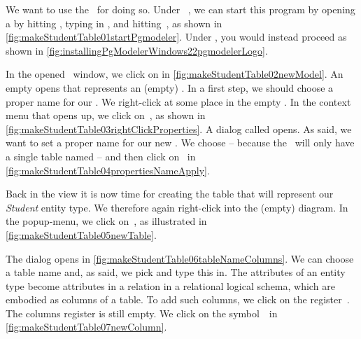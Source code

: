 We want to use the \pgmodeler\ for doing so.
Under \ubuntu\ \linux, we can start this program by opening a  by hitting \ubuntuTerminal, typing in , and hitting~\keys{\return}, as shown in \cref{fig:makeStudentTable01startPgmodeler}.
Under \microsoftWindows, you would instead proceed as shown in \cref{fig:installingPgModelerWindows22pgmodelerLogo}.

In the opened \pgmodeler\ window, we click on  in \cref{fig:makeStudentTable02newModel}.
An empty  opens that represents an (empty) \db.
In a first step, we should choose a proper name for our \db.
We right-click at some place in the empty .
In the context menu that opens up, we click on~, as shown in \cref{fig:makeStudentTable03rightClickProperties}.
A dialog called  opens.
As said, we want to set a proper name for our new \db.
We choose  -- because the \db\ will only have a single table named  -- and then click on~ in \cref{fig:makeStudentTable04propertiesNameApply}.

Back in the  view it is now time for creating the table that will represent our \emph{Student} entity type.
We therefore again right-click into the (empty) diagram.
In the popup-menu, we click on~, as illustrated in \cref{fig:makeStudentTable05newTable}.

The  dialog opens in \cref{fig:makeStudentTable06tableNameColumns}.
We can choose a table name and, as said, we pick  and type this in.
The attributes of an entity type become attributes in a relation in a relational logical schema, which are embodied as columns of a table.
To add such columns, we click on the register~.
The columns register is still empty.
We click on the  symbol~\pgmodelerAddItem\ in \cref{fig:makeStudentTable07newColumn}.

